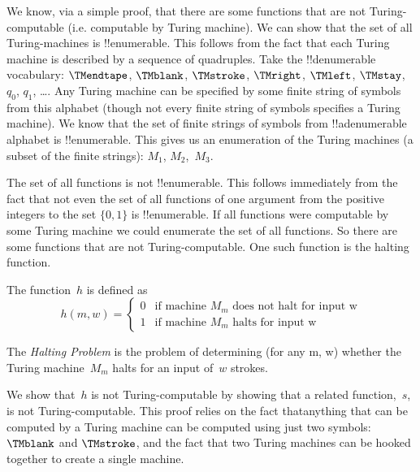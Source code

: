 \documentclass[../../../include/open-logic-section]{subfiles}
\begin{document}

\begin{explain}
We know, via a simple proof, that there are some functions that are not
Turing-computable (i.e. computable by Turing machine).
We can show that the set of all Turing-machines is !!{enumerable}. This
follows from the fact that each Turing machine is described by a sequence
of quadruples. Take the !!{denumerable} vocabulary: $\TMendtape$,
$\TMblank$, $\TMstroke$, $\TMright$, $\TMleft$, $\TMstay$, $q_0$,
$q_1$, \dots. Any Turing machine
can be specified by some finite string of symbols from this alphabet
(though not every finite string of symbols specifies a Turing machine). We
know that the set of finite strings of symbols from !!a{denumerable}
alphabet is !!{enumerable}. This gives us an enumeration of the Turing
machines (a subset of the finite strings): $M_1$, $M_2$,~$M_3$.

The set of all functions is not !!{enumerable}. This follows immediately from
the fact that not even the set of all functions of one argument from the
positive integers to the set $\{0,1\}$ is !!{enumerable}.
If all functions were computable by some Turing machine we could enumerate
the set of all functions. So there are some functions that are not
Turing-computable. One such function is the halting function.
\end{explain}

\begin{defn} The function~$h$ is defined as
\[
h(m,w) =
\begin{cases}
  \text{0} & \text{if machine~$M_m$ does not halt for input w} \\
  \text{1} & \text{if machine~$M_m$ halts for input w}
\end{cases}
\]
\end{defn}

\begin{defn}
The \emph{Halting Problem} is the problem of determining (for any m, w)
whether the Turing machine~$M_m$ halts for an input of~$w$ strokes.
\end{defn}

\begin{explain}
We show that~$h$ is not Turing-computable by showing that a related
function,~$s$, is not Turing-computable. This proof relies on the fact
thatanything that can be computed by a Turing machine can be computed
using just two symbols: $\TMblank$ and $\TMstroke$, and the fact that two
Turing machines can be hooked together to create a single machine.
\end{explain}
\end{document}
